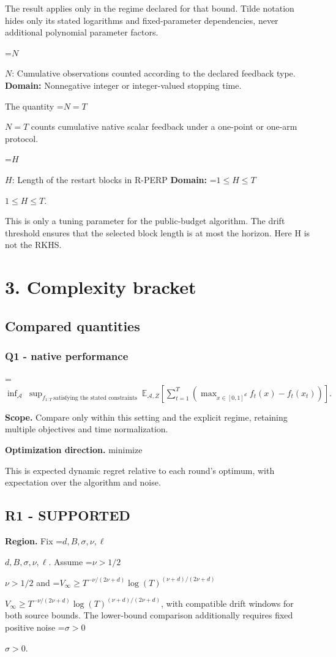 \documentclass[10pt,a4paper]{article}
\newcommand{\AtlasMath}[1]{\par\begingroup\centering\setbox0=\hbox{$\displaystyle #1$}\ifdim\wd0>1.4\linewidth\typeout{ATLAS WIDE FORMULA: \the\wd0}\fi\ifdim\wd0>\linewidth\resizebox{\linewidth}{!}{\box0}\else\box0\fi\par\endgroup}
\newcommand{\AtlasInlineMath}[1]{\begingroup\setbox0=\hbox{$#1$}\ifdim\wd0>.4\linewidth\endgroup\AtlasMath{#1}\else\endgroup$#1$\fi}
\begin{document}
The result applies only in the regime declared for that bound. Tilde notation hides only its stated logarithms and fixed-parameter dependencies, never additional polynomial parameter factors.

\AtlasInlineMath{N}: Cumulative observations counted according to the declared feedback type. \textbf{Domain:} Nonnegative integer or integer-valued stopping time.

The quantity \AtlasInlineMath{N=T} counts cumulative native scalar feedback under a one-point or one-arm protocol.

\AtlasInlineMath{H}: Length of the restart blocks in R-PERP \textbf{Domain:} \AtlasInlineMath{1\le H\le T}.

This is only a tuning parameter for the public-budget algorithm. The drift threshold ensures that the selected block length is at most the horizon. Here H is not the RKHS.

\section{3. Complexity bracket}
\subsection{Compared quantities}
\subsubsection{Q1 - native performance}
\AtlasMath{\inf_{\mathcal A}\ \sup_{f_{1:T}\ \text{satisfying the stated constraints}}\ \mathbb E_{\mathcal A,Z}\!\left[\sum_{t=1}^{T}\left(\max_{x\in[0,1]^d}f_t(x)-f_t(x_t)\right)\right].}
\textbf{Scope.} Compare only within this setting and the explicit regime, retaining multiple objectives and time normalization.

\textbf{Optimization direction.} minimize

This is expected dynamic regret relative to each round's optimum, with expectation over the algorithm and noise.

\subsection{R1 - SUPPORTED}
\textbf{Region.} Fix \AtlasInlineMath{d,B,\sigma,\nu,\ell}. Assume \AtlasInlineMath{\nu>1/2} and \AtlasInlineMath{V_\infty\ge T^{-\nu/(2\nu+d)}\log(T)^{(\nu+d)/(2\nu+d)}}, with compatible drift windows for both source bounds. The lower-bound comparison additionally requires fixed positive noise \AtlasInlineMath{\sigma>0}.
\end{document}
